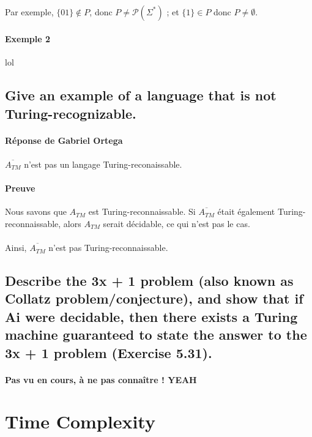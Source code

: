 \paragraph{}
Par exemple, $\{01\} \not\in P$, donc $P \neq \mathcal{P}(\Sigma^{*})$ ; et $\{1\} \in P$ donc $P \neq \emptyset$.

\paragraph{Exemple 2}
lol
\subsection{Give an example of a language that is not Turing-recognizable. }
\paragraph{Réponse de Gabriel Ortega}
\paragraph{}
$\overline{A_{TM}}$ n'est pas un langage Turing-reconaissable.

\paragraph{Preuve} Nous savons que $A_{TM}$ est Turing-reconnaissable. Si $\overline{A_{TM}}$ était également Turing-reconnaissable, alors $A_{TM}$ serait décidable, ce qui n'est pas le cas. 
\paragraph{}
Ainsi, $\overline{A_{TM}}$ n'est pas Turing-reconnaissable.




\subsection{Describe the 3x + 1 problem (also known as Collatz problem/conjecture), and show that if Ai were decidable, then there exists a Turing machine guaranteed to state the answer to the 3x + 1 problem (Exercise 5.31).}
\paragraph{Pas vu en cours, à ne pas connaître ! YEAH}

\section{Time Complexity}

